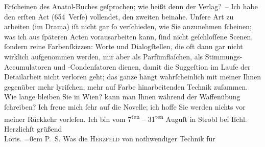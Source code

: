 \begin{ledgroupsized}[t]{13cm}
               Erſcheinen des Anatol-Buches geſprochen; wie
               heißt denn der Verlag? –\pend
           \pstart
           Ich habe den erſten Act
               (654 Verſe) vollendet, den zweiten beinahe.\pend
           \pstart
           Unſere Art zu arbeiten (im Drama) iſt nicht gar ſo verſchieden, wie Sie anzunehmen
               ſcheinen; was ich {\pb}aus ſpäteren
               Acten vorausarbeiten kann, ſind nicht geſchloſſene Scenen, ſondern reine
               Farbenſkizzen: Worte und Dialogſtellen, die oft dann gar nicht wirklich aufgenommen
               werden, mir aber als Parfümflaſchen, als Stimmungs-Accumulatoren und -Condenſatoren
               dienen, damit die Suggeſtion im Laufe der Detailarbeit nicht verloren geht; das ganze
               hängt wahrſcheinlich mit meiner Ihnen gegenüber mehr lyriſchen, mehr auf Farbe
               hinarbeitenden Technik zuſammen. Wie lange {\pb}bleiben Sie in Wien? kann man Ihnen während der Waffenübung ſchreiben?\pend
           \pstart
           Ich freue mich ſehr auf die Novelle; ich hoffe
               Sie werden nichts vor meiner Rückkehr vorleſen.\pend
           \pstart
           Ich bin vom 7\textsuperscript{ten} – 31\textsuperscript{ten} Auguſt in Strobl bei Iſchl.\pend
           \pstart
           Herzlichſt grüßend{\\[\baselineskip]}\spacefill\mbox{Loris.}\pend
           \leftskip=0em{}\pstart
           \noindent{}\textsc{P. S.} Was die \textsc{Herzfeld} von nothwendiger Technik  für

\end{ledgroupsized}
